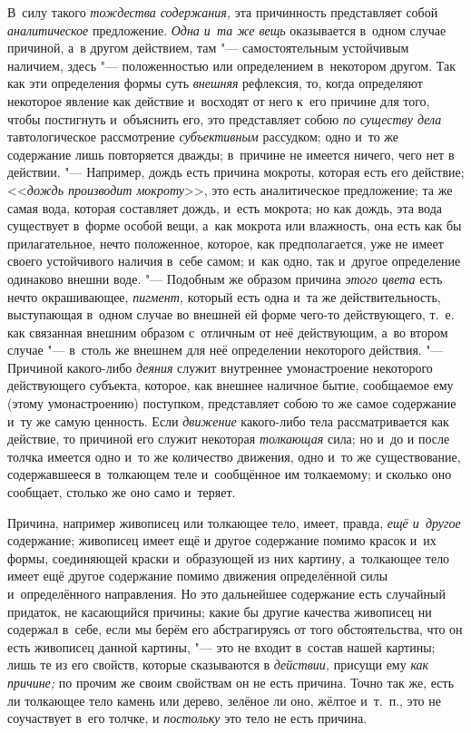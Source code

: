 В~силу такого {\em тождества содержания,} эта причинность представляет собой
{\em аналитическое} предложение. {\em Одна и~та же вещь} оказывается в~одном
случае причиной, а~в другом действием, там "--- самостоятельным устойчивым
наличием, здесь "--- положенностью или определением в~некотором другом. Так как
эти определения формы суть {\em внешняя} рефлексия, то, когда определяют
некоторое явление как действие и~восходят от него к~его причине для того, чтобы
постигнуть и~объяснить его, это представляет собою {\em по существу дела}
тавтологическое рассмотрение {\em субъективным} рассудком; одно и~то же
содержание лишь повторяется дважды; в~причине не имеется ничего, чего нет в
действии. "--- Например, дождь есть причина мокроты, которая есть его действие;
<<{\em дождь производит мокроту}>>, это есть аналитическое предложение; та же
самая вода, которая составляет дождь, и~есть мокрота; но как дождь, эта вода
существует в~форме особой вещи, а~как мокрота или влажность, она есть как бы
прилагательное, нечто положенное, которое, как предполагается, уже не имеет
своего устойчивого наличия в~себе самом; и~как одно, так и~другое определение
одинаково внешни воде. "--- Подобным же образом причина {\em этого цвета} есть
нечто окрашивающее, {\em пигмент,} который есть одна и~та же действительность,
выступающая в~одном случае во внешней ей форме чего-то действующего, т.~е. как
связанная внешним образом с~отличным от неё действующим, а~во втором случае
"--- в~столь же внешнем для неё определении некоторого действия. "--- Причиной
какого-либо {\em деяния} служит внутреннее умонастроение некоторого
действующего субъекта, которое, как внешнее наличное бытие, сообщаемое ему
(этому умонастроению) поступком, представляет собою то же самое содержание и~ту
же самую ценность. Если {\em движение} какого-либо тела рассматривается как
действие, то причиной его служит некоторая {\em толкающая} сила; но и~до и
после толчка имеется одно и~то же количество движения, одно и~то же
существование, содержавшееся в~толкающем теле и~сообщённое им толкаемому; и
сколько оно сообщает, столько же оно само и~теряет.

Причина, например живописец или толкающее тело, имеет, правда,
{\em ещё и~другое} содержание; живописец имеет ещё и
другое содержание помимо красок и~их формы, соединяющей краски и~образующей
из них картину, а~толкающее тело имеет ещё другое содержание помимо
движения определённой силы и~определённого направления. Но это дальнейшее
содержание есть случайный придаток, не касающийся причины; какие бы другие
качества живописец ни содержал в~себе, если мы берём его абстрагируясь от
того обстоятельства, что он есть живописец данной картины, "--- это не входит
в~состав нашей картины; лишь те из его свойств, которые сказываются в
{\em действии,} присущи ему {\em как причине;} по прочим же своим свойствам
он не есть причина. Точно так же, есть ли толкающее тело камень или дерево,
зелёное ли оно, жёлтое и~т.~п., это не соучаствует в~его толчке, и
{\em постольку} это тело не есть причина.


